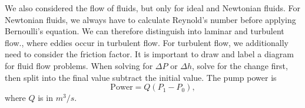 \documentclass[11pt]{article}
\theoremstyle{plain} %
\theoremstyle{definition}
\theoremstyle{example}
\theoremstyle{remark}
\begin{document}
We also considered the flow of fluids, but only for ideal and Newtonian fluids. For Newtonian fluids, we always have to calculate Reynold's number before applying Bernoulli's equation. We can therefore distinguish into laminar and turbulent flow., where eddies occur in turbulent flow. For turbulent flow, we additionally need to consider the friction factor. It is important to draw and label a diagram for fluid flow problems. When solving for $\Delta P$ or $\Delta h$, solve for the change first, then split into the final value subtract the initial value. The pump power is 
$$\text{Power}= Q(P_1-P_0),$$
where $Q$ is in $m^3/s$.










































	
	
\end{document}
